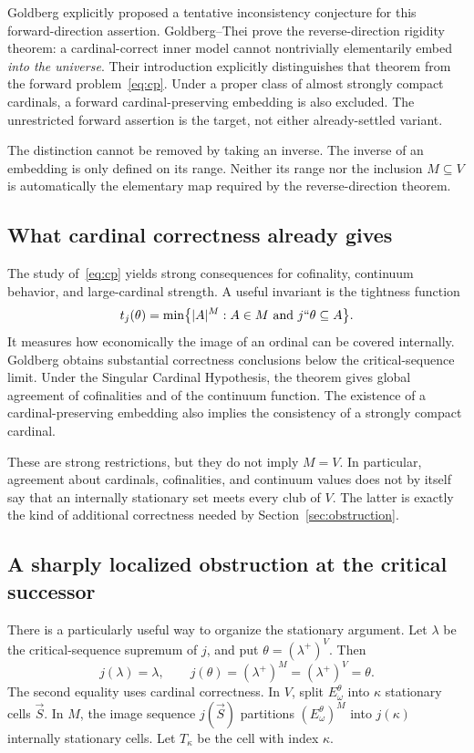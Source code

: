 \documentclass[11pt,letterpaper]{article}
\theoremstyle{definition}
\begin{document}
Goldberg explicitly proposed a tentative inconsistency conjecture for this forward-direction assertion. Goldberg--Thei prove the reverse-direction rigidity theorem: a cardinal-correct inner model cannot nontrivially elementarily embed \emph{into the universe}. Their introduction explicitly distinguishes that theorem from the forward problem~\eqref{eq:cp}. Under a proper class of almost strongly compact cardinals, a forward cardinal-preserving embedding is also excluded. The unrestricted forward assertion is the target, not either already-settled variant. \cite{goldbergcp,goldbergthei}

The distinction cannot be removed by taking an inverse. The inverse of an embedding is only defined on its range. Neither its range nor the inclusion $M\subseteq V$ is automatically the elementary map required by the reverse-direction theorem.

\subsection{What cardinal correctness already gives}

The study of~\eqref{eq:cp} yields strong consequences for cofinality, continuum behavior, and large-cardinal strength. A useful invariant is the tightness function
\[
 t_j(\theta)=\min\bigl\{|A|^M:A\in M\text{ and }j``\theta\subseteq A\bigr\}.
\]
It measures how economically the image of an ordinal can be covered internally. Goldberg obtains substantial correctness conclusions below the critical-sequence limit. Under the Singular Cardinal Hypothesis, the theorem gives global agreement of cofinalities and of the continuum function. The existence of a cardinal-preserving embedding also implies the consistency of a strongly compact cardinal. \cite[Theorems~2.3 and~2.7--2.11]{goldbergcp}

These are strong restrictions, but they do not imply $M=V$. In particular, agreement about cardinals, cofinalities, and continuum values does not by itself say that an internally stationary set meets every club of $V$. The latter is exactly the kind of additional correctness needed by Section~\ref{sec:obstruction}.

\subsection{A sharply localized obstruction at the critical successor}

There is a particularly useful way to organize the stationary argument. Let $\lambda$ be the critical-sequence supremum of $j$, and put $\theta=(\lambda^+)^V$. Then
\[
 j(\lambda)=\lambda,\qquad
 j(\theta)=(\lambda^+)^M=(\lambda^+)^V=\theta.
\]
The second equality uses cardinal correctness. In $V$, split $E^\theta_\omega$ into $\kappa$ stationary cells $\vec S$. In $M$, the image sequence $j(\vec S)$ partitions $(E^\theta_\omega)^M$ into $j(\kappa)$ internally stationary cells. Let $T_\kappa$ be the cell with index $\kappa$.
\end{document}
